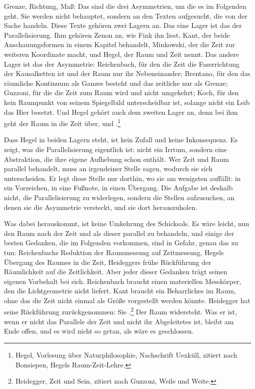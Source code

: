 Grenze, Richtung, Maß: Das sind die drei Asymmetrien, um die es im Folgenden geht. Sie werden nicht behauptet, sondern an den Texten aufgesucht, die von der Sache handeln. Diese Texte gehören zwei Lagern an. Das eine Lager ist das der Parallelisierung. Ihm gehören Zenon an, wie Fink ihn liest, Kant, der beide Anschauungsformen in einem Kapitel behandelt, Minkowski, der die Zeit zur weiteren Koordinate macht, und Hegel, der Raum und Zeit  nennt. Das andere Lager ist das der Asymmetrie: Reichenbach, für den die Zeit die Faserrichtung der Kausalketten ist und der Raum nur ihr Nebeneinander; Brentano, für den das räumliche Kontinuum als Ganzes besteht und das zeitliche nur als Grenze; Guzzoni, für die die Zeit zum Raum wird und nicht umgekehrt; Koch, für den kein Raumpunkt von seinem Spiegelbild unterscheidbar ist, solange nicht ein Leib das Hier besetzt. Und Hegel gehört auch dem zweiten Lager an, denn bei ihm geht der Raum in die Zeit über, und .\footnote{Hegel, Vorlesung über Naturphilosophie, Nachschrift Uexküll, zitiert nach Bonsiepen, Hegels Raum-Zeit-Lehre.}

Dass Hegel in beiden Lagern steht, ist kein Zufall und keine Inkonsequenz. Es zeigt, was die Parallelisierung eigentlich ist: nicht ein Irrtum, sondern eine Abstraktion, die ihre eigene Aufhebung schon enthält. Wer Zeit und Raum parallel behandelt, muss an irgendeiner Stelle sagen, wodurch sie sich unterscheiden. Er legt diese Stelle nur dorthin, wo sie am wenigsten auffällt: in ein Vorzeichen, in eine Fußnote, in einen Übergang. Die Aufgabe ist deshalb nicht, die Parallelisierung zu widerlegen, sondern die Stellen aufzusuchen, an denen sie die Asymmetrie versteckt, und sie dort herauszuholen.

Was dabei herauskommt, ist keine Umkehrung des Schicksals. Es wäre leicht, nun den Raum nach der Zeit und als dieser parallel zu behandeln, und einige der besten Gedanken, die im Folgenden vorkommen, sind in Gefahr, genau das zu tun: Reichenbachs Reduktion der Raummessung auf Zeitmessung, Hegels Übergang des Raumes in die Zeit, Heideggers frühe Rückführung der Räumlichkeit auf die Zeitlichkeit. Aber jeder dieser Gedanken trägt seinen eigenen Vorbehalt bei sich. Reichenbach braucht einen materiellen Messkörper, den die Lichtgeometrie nicht liefert. Kant braucht ein Beharrliches im Raum, ohne das die Zeit nicht einmal als Größe vorgestellt werden könnte. Heidegger hat seine Rückführung zurückgenommen: Sie .\footnote{Heidegger, Zeit und Sein, zitiert nach Guzzoni, Weile und Weite.} Der Raum widersteht. Was er ist, wenn er nicht das Parallele der Zeit und nicht ihr Abgeleitetes ist, bleibt am Ende offen, und es wird nicht so getan, als wäre es geschlossen.
